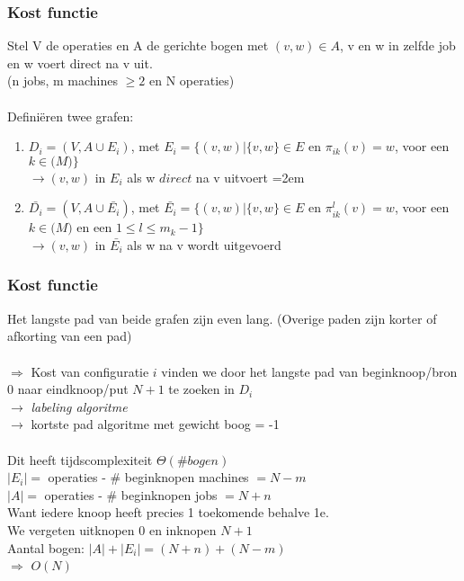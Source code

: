 \documentclass
   [kulak] %
   {kulakbeamer}
\newcommand\tab[1][1cm]{\hspace*{#1}}
\begin{document}
\begin{frame}
	\frametitle{Kost functie}
	Stel V de operaties en A de gerichte bogen 	
	met $(v,w) \in A$, v en w in zelfde job en w voert direct na v uit. \\ (n jobs, m machines $\geqslant 2$ en N operaties)\\~\\ \pause
	Definiëren twee grafen:
	\begin{enumerate}
		\item $D_i = (V, A \cup E_i)$, met $E_i = \{(v, w) | \{v, w\} \in E$ en 		$\pi_{ik}(v) = w$, voor een $k \in \mathscr(M)\}$\\
		$\rightarrow (v,w)$ in $E_i$ als w $direct$ na v uitvoert
		\itemsep=2em
		\item $\bar{D_i} = (V, A \cup \bar{E_i})$, met $\bar{E_i} = \{(v, w) | \{v, w\} \in E$ en $\pi_{ik}^l(v) = w$, voor een $k \in \mathscr(M)$ en een  $ 1 \le l \le m_k -1\}$\\
		$\rightarrow (v,w)$ in $\bar{E_i}$ als w na v wordt uitgevoerd
	\end{enumerate}
	

	
\end{frame}

\begin{frame}
\frametitle{Kost functie}
	
	Het langste pad van beide grafen zijn even lang. (Overige paden zijn korter of afkorting van een pad)\\~\\
	\pause
	$\Rightarrow$ Kost van configuratie $i$ vinden we door het langste pad van beginknoop/bron $0$ naar eindknoop/put $N + 1$ te zoeken in $D_i$\\ $\rightarrow$  \textit{labeling algoritme}\\\tab $\rightarrow$ 
	kortste pad algoritme met gewicht boog = -1
	\\~\\
	\pause
	Dit heeft tijdscomplexiteit $\Theta(\# bogen)$\\
	$|E_i| =$ operaties - \# beginknopen machines $= N - m$\\
	$|A| =$ operaties - \# beginknopen jobs $= N + n$
	\\ Want iedere knoop heeft precies 1 toekomende behalve 1e. \\
	We vergeten uitknopen 0  en inknopen $N + 1$\\
	Aantal bogen: $|A| + |E_i| = (N + n) + (N - m)$ \\
	\tab $\Rightarrow$ $O(N)$


\end{frame}
\end{document}
